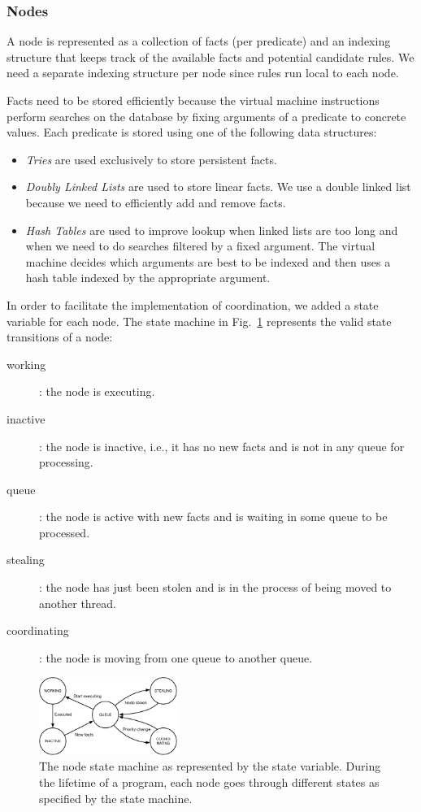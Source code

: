 \subsubsection{Nodes}

A node is represented as a collection of facts (per predicate) and an indexing structure that
keeps track of the available facts and potential candidate rules. We need
a separate indexing structure per node since rules run local to each node.

Facts need to be stored efficiently because the virtual machine instructions
perform searches on the database by fixing arguments of a predicate to concrete
values. Each predicate is stored using one of the following data structures:

\begin{itemize}
\item \emph{Tries} are used exclusively to store persistent facts.
\item \emph{Doubly Linked Lists} are used to store 
  linear facts. We use a double linked list because we need to efficiently add
  and remove facts.
\item \emph{Hash Tables} are used to improve lookup when 
  linked lists are too long and when we need to do searches filtered by
  a fixed argument. The virtual machine decides which arguments are
  best to be indexed and then uses a hash table
  indexed by the appropriate argument.
\end{itemize}

In order to facilitate the implementation of coordination, we added a state
variable for each node. The state machine in
Fig.~\ref{fig:node_states} represents the valid state transitions of a node:

\begin{description}
   \item[working]: the node is executing.
   \item[inactive]: the node is inactive, i.e., it has no new facts and is not in any
   queue for processing.
   \item[queue]: the node is active with new facts and is waiting in some queue
   to be processed.
   \item[stealing]: the node has just been stolen and is in the process of being
   moved to another thread.
   \item[coordinating]: the node is moving from one queue to another queue.
\end{description}

\begin{figure}[h!]
   \centering
   \includegraphics[width=0.4\textwidth]{node_states.pdf}
   \caption{The node state machine as represented by the state variable. During
      the lifetime of a program, each node goes through different states as
      specified by the state machine.}
   \label{fig:node_states}
\end{figure}

